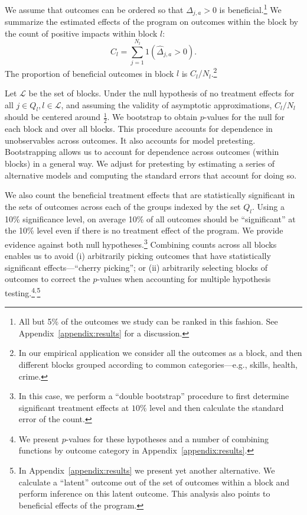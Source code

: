 We assume that outcomes can be ordered so that $\Delta_{j,a} >0$ is beneficial.\footnote{All but 5\% of the outcomes we study can be ranked in this fashion. See Appendix~\ref{appendix:results} for a discussion.} We summarize the estimated effects of the program on outcomes within the block by the count of positive impacts within block $l$:
\begin{equation}
C_l = \sum^{N_l}_{j=1} 1 (\hat{\Delta}_{j,a} >0).
\end{equation}
The proportion of beneficial outcomes in block $l$ is $C_l / N_l$.\footnote{In our empirical application we consider all the outcomes as a block, and then different blocks grouped according to common categories---e.g., skills, health, crime.}

Let $\mathcal{L}$ be the set of blocks. Under the null hypothesis of no treatment effects for all $j \in Q_l, l \in \mathcal{L}$, and assuming the validity of asymptotic approximations, $C_l / N_l$ should be centered around $\frac{1}{2}$. We bootstrap to obtain $p$-values for the null for each block and over all blocks. This procedure accounts for dependence in unobservables across outcomes. It also accounts for model pretesting. Bootstrapping allows us to account for dependence across outcomes (within blocks) in a general way. We adjust for pretesting by estimating a series of alternative models and computing the standard errors that account for doing so.

We also count the beneficial treatment effects that are statistically significant in the sets of outcomes across each of the groups indexed by the set $Q_l$. Using a 10\% significance level, on average 10\% of all outcomes should be ``significant'' at the 10\% level even if there is no treatment effect of the program. We provide evidence against both null hypotheses.\footnote{In this case, we perform a ``double bootstrap'' procedure to first determine significant treatment effects at $10\%$ level and then calculate the standard error of the count.} Combining counts across all blocks enables us to avoid (i) arbitrarily picking outcomes that have statistically significant effects---``cherry picking''; or (ii) arbitrarily selecting blocks of outcomes to correct the $p$-values when accounting for multiple hypothesis testing.\footnote{We present $p$-values for these hypotheses and a number of combining functions by outcome category in Appendix~\ref{appendix:results}.}$^{\text{,}}$\footnote{In Appendix~\ref{appendix:results} we present yet another alternative. We calculate a ``latent'' outcome out of the set of outcomes within a block and perform inference on this latent outcome. This analysis also points to beneficial effects of the program.} 